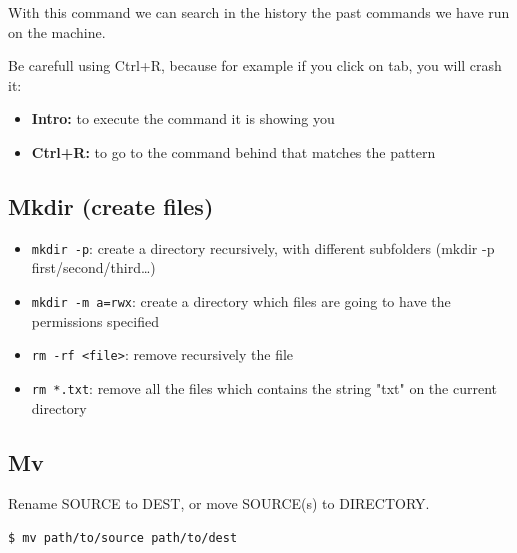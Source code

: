 \documentclass{article}
\newenvironment{codetemplate}[1][]{%
  \mybasecolorbox[#1]
  \itshape
}{%
  \endmybasecolorbox
}
\begin{document}
With this command we can search in the history the past commands we have run on the machine.

Be carefull using Ctrl+R, because for example if you click on tab, you will crash it:

\begin{itemize}
    \item \textbf{Intro:} to execute the command it is showing you
    \item \textbf{Ctrl+R:} to go to the command behind that matches the pattern
\end{itemize}

\subsection{Mkdir (create files)}
\begin{itemize}
    \item \verb+mkdir -p+: create a directory recursively, with different subfolders (mkdir -p first/second/third…)
    \item \verb+mkdir -m a=rwx+: create a directory which files are going to have the permissions specified
    \item \verb+rm -rf <file>+: remove recursively the file
    \item \verb+rm *.txt+: remove all the files which contains the string "txt" on the current directory
\end{itemize}

\subsection{Mv}
Rename SOURCE to DEST, or move SOURCE(s) to DIRECTORY.
\begin{codetemplate}{}
\begin{verbatim}
$ mv path/to/source path/to/dest
\end{verbatim}
\end{codetemplate}
\end{document}
